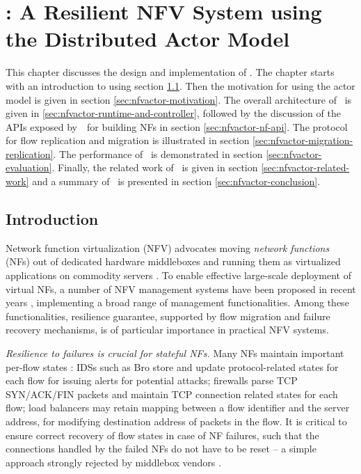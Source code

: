 \chapter {\nfactor: A Resilient NFV System using the Distributed Actor Model}
\label{ch:nfvactor}

This chapter discusses the design and implementation of \nfactor. The chapter starts with an introduction to \nfactor using section \ref{sec:nfvactor-introduction}. Then the motivation for using the actor model is given in section \ref{sec:nfvactor-motivation}. The overall architecture of \nfactor~is given in \ref{sec:nfvactor-runtime-and-controller}, followed by the discussion of the APIs exposed by~\nfactor~for building NFs in section \ref{sec:nfvactor-nf-api}. The protocol for flow replication and migration is illustrated in section \ref{sec:nfvactor-migration-replication}. The performance of \nfactor~is demonstrated in section \ref{sec:nfvactor-evaluation}. Finally, the related work of \nfactor~is given in section \ref{sec:nfvactor-related-work} and a summary of \nfactor~is presented in section \ref{sec:nfvactor-conclusion}.

\section{Introduction}
\label{sec:nfvactor-introduction}

Network function virtualization (NFV) advocates moving
{\em network functions} (NFs) out of dedicated hardware middleboxes and running them as virtualized applications on commodity servers \cite{nfv-white-paper}. To enable effective large-scale deployment of virtual NFs, a number of NFV management systems have been proposed in recent years \cite{palkar2015e2, OpenBox, sekar2012design, anderson2012xomb, gember2012stratos, zhang2016opennetvm}, implementing a broad range of management functionalities. Among these functionalities, resilience guarantee, supported by flow migration and failure recovery mechanisms, is of particular importance in practical NFV systems.


{\em Resilience to failures \cite{sherry2015rollback,rajagopalan2013pico} is crucial for stateful NFs.}  Many NFs maintain important per-flow states \cite{EnablingNF}: IDSs such as Bro \cite{bro} store and update protocol-related states for each flow for issuing alerts for potential attacks; firewalls \cite{firewall} parse TCP SYN/ACK/FIN packets and maintain TCP connection related states for each flow; load balancers \cite{lvs} may retain mapping between a flow identifier and the server address, for modifying destination address of packets in the flow. It is critical to ensure correct recovery of flow states in case of NF failures, such that the connections handled by the failed NFs do not have to be reset -- a simple approach strongly rejected by middlebox vendors \cite{sherry2015rollback}.


